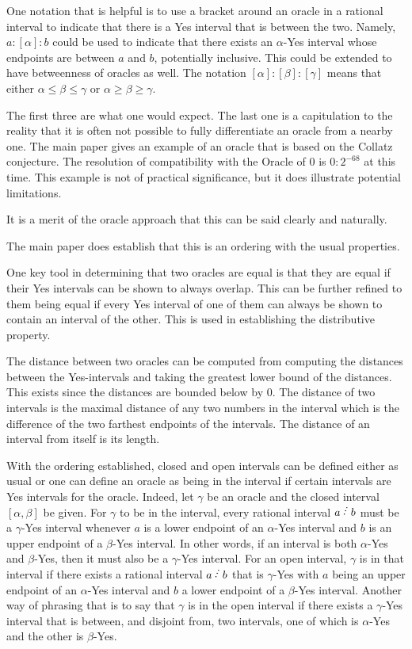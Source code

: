 \documentclass[12pt]{article}
\begin{document}
One notation that is helpful is to use a bracket around an oracle in a rational interval to indicate that there is a Yes interval that is between the two. Namely, $a: [\alpha] : b$ could be used to indicate that there exists an  $\alpha$-Yes interval whose endpoints are between $a$ and $b$, potentially inclusive. This could be extended to have betweenness of oracles as well. The notation $[\alpha] : [\beta] : [\gamma]$ means that either $ \alpha \leq \beta \leq \gamma$ or $\alpha \geq \beta \geq \gamma$.

The first three are what one would expect. The last one is a capitulation to the reality that it is often not possible to fully differentiate an oracle from a nearby one. The main paper gives an example of an oracle that is based on the Collatz conjecture. The resolution of compatibility with the Oracle of 0 is $0:2^{-68}$ at this time. This example is not of practical significance, but it does illustrate potential limitations. 

 It is a merit of the oracle approach that this can be said clearly and naturally. 

The main paper does establish that this is an ordering with the usual properties. 

One key tool in determining that two oracles are equal is that they are equal if their Yes intervals can be shown to always overlap. This can be further refined to them being equal if every Yes interval of one of them can always be shown to contain an interval of the other. This is used in establishing the distributive property. 

The distance between two oracles can be computed from computing the distances between the Yes-intervals and taking the greatest lower bound of the distances. This exists since the distances are bounded below by 0. The distance of two intervals is the maximal distance of any two numbers in the interval which is the difference of the two farthest endpoints of the intervals. The distance of an interval from itself is its length. 

With the ordering established, closed and open intervals can be defined either as usual or one can define an oracle as being in the interval if certain intervals are Yes intervals for the oracle. Indeed, let $\gamma$ be an oracle and the closed interval $[\alpha, \beta]$ be given. For $\gamma$ to be in the interval, every rational interval $a\lte b$ must be a $\gamma$-Yes interval whenever $a$ is a lower endpoint of an $\alpha$-Yes interval and $b$ is an upper endpoint of a $\beta$-Yes interval. In other words, if an interval is both $\alpha$-Yes and $\beta$-Yes, then it must also be a $\gamma$-Yes interval. For an open interval, $\gamma$ is in that interval if there exists a rational interval $a\lte b$ that is $\gamma$-Yes with $a$ being an upper endpoint of an $\alpha$-Yes interval and $b$ a lower endpoint of a $\beta$-Yes interval. Another way of phrasing that is to say that $\gamma$ is in the open interval if there exists a $\gamma$-Yes interval that is between, and disjoint from, two intervals, one of which is $\alpha$-Yes and the other is $\beta$-Yes. 
\end{document}
